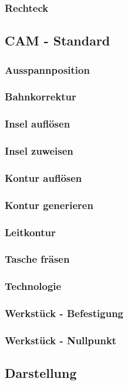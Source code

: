 \documentclass[a4paper]{book}
\begin{document}
			\subsubsection{Rechteck} 
		\subsection{CAM - Standard}
			\subsubsection{Ausspannposition} 
			\subsubsection{Bahnkorrektur} 
			\subsubsection{Insel auflösen}
			\subsubsection{Insel zuweisen} 
			\subsubsection{Kontur auflösen}
			\subsubsection{Kontur generieren}
			\subsubsection{Leitkontur} 
			\subsubsection{Tasche fräsen} 
			\subsubsection{Technologie} 
			\subsubsection{Werkstück - Befestigung} 
			\subsubsection{Werkstück - Nullpunkt} 
		\subsection{Darstellung}
\end{document}
